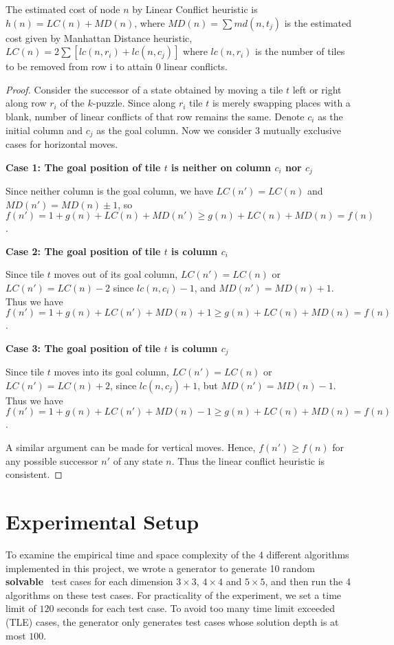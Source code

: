 \documentclass{llncs}
\begin{document}
The estimated cost of node $n$ by Linear Conflict heuristic is $h(n) = LC(n) + MD(n)$, where $MD(n)=\sum md(n,t_j)$ is the estimated cost given by Manhattan Distance heuristic, $LC(n) = 2\sum[lc(n,r_i) +lc(n,c_j)]$ where $lc(n,r_i)$ is the number of tiles to be removed from row i to attain 0 linear conflicts.
\begin{proof}
Consider the successor of a state obtained by moving a tile $t$ left or right along row $r_i$ of the $k$-puzzle. Since along $r_i$ tile $t$ is merely swapping places with a blank, number of linear conflicts of that row remains the same.
Denote $c_i$ as the initial column and $c_j$ as the goal column. Now we consider 3 mutually exclusive cases for horizontal moves.

\textbf{Case 1: The goal position of tile $t$ is neither on column $c_i$ nor $c_j$}

Since neither column is the goal column, we have $LC(n') = LC(n)$ and $MD(n') = MD(n) \pm 1$, so $f(n') = 1 + g(n) + LC(n) + MD(n') \geq g(n) + LC(n) + MD(n) = f(n)$.

\textbf{Case 2: The goal position of tile $t$ is column $c_i$}

Since tile $t$ moves out of its goal column, $LC(n') = LC(n)$ or $LC(n') = LC(n) - 2$ since $lc(n,c_i) - 1$, and $MD(n') = MD(n) + 1$. Thus we have $f(n') = 1 + g(n) + LC(n') + MD(n) + 1 \geq g(n) + LC(n) + MD(n) = f(n)$.

\textbf{Case 3: The goal position of tile $t$ is column $c_j$}

Since tile $t$ moves into its goal column, $LC(n') = LC(n)$ or $LC(n') = LC(n) + 2$, since $lc(n,c_j) + 1$, but $MD(n') = MD(n) - 1$. Thus we have $f(n') = 1 + g(n) + LC(n') + MD(n) - 1 \geq g(n) + LC(n) + MD(n) = f(n)$.

A similar argument can be made for vertical moves. Hence, $f(n') \geq f(n)$ for any possible successor $n'$ of any state $n$. Thus the linear conflict heuristic is consistent.
\end{proof}

\section{Experimental Setup}
To examine the empirical time and space complexity of the 4 different algorithms implemented in this project, we wrote a generator to generate 10 random \textbf{solvable}~\cite{solvable} test cases for each dimension $3 \times 3$, $4 \times 4$ and $5 \times 5$, and then run the 4 algorithms on these test cases. For practicality of the experiment, we set a time limit of $120$ seconds for each test case. To avoid too many time limit exceeded (TLE) cases, the generator only generates test cases whose solution depth is at most $100$.
\end{document}

